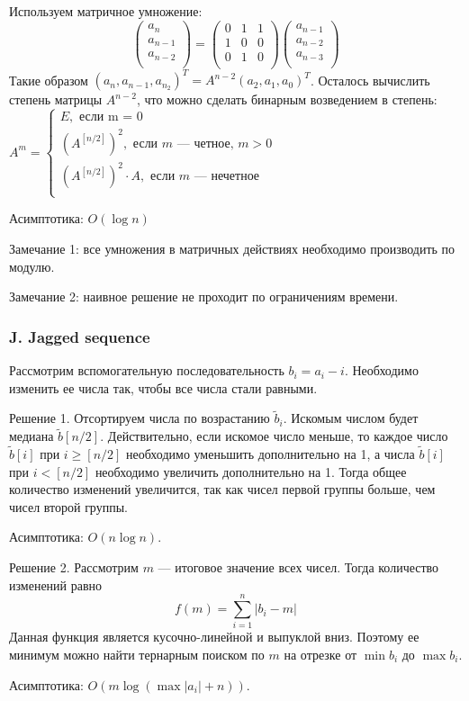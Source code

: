 Используем матричное умножение:
$$
\begin{pmatrix}
a_{n} \\
a_{n-1} \\
a_{n-2} \\
\end{pmatrix}
=
\begin{pmatrix}
0 & 1 & 1 \\
1 & 0 & 0 \\
0 & 1 & 0 \\
\end{pmatrix}
\begin{pmatrix}
a_{n-1} \\
a_{n-2} \\
a_{n-3} \\
\end{pmatrix}
$$
Такие образом $(a_n, a_{n-1}, a_{n_2})^{T} = A^{n-2} (a_2, a_1, a_0)^{T}$. Осталось вычислить степень матрицы $A^{n-2}$, что можно сделать бинарным возведением в степень:
$
A^m =
\begin{cases}
E, \text{ если m = 0}\\
\left(A^{[n/2]}\right) ^ 2, \text{ если } m \text{ --- четное, }m > 0\\
\left(A^{[n/2]}\right) ^ 2 \cdot A, \text{ если } m \text{ --- нечетное}\\
\end{cases}
$

Асимптотика: $O(\log n)$ 

Замечание 1: все умножения в матричных действиях необходимо производить по модулю.

Замечание 2: наивное решение не проходит по ограничениям времени.



\subsubsection*{J. Jagged sequence} 


Рассмотрим вспомогательную последовательность $b_i = a_i - i$. Необходимо изменить ее числа так, чтобы все числа стали равными.

Решение 1. Отсортируем числа по возрастанию $\tilde{b}_i$. Искомым числом будет медиана $\tilde{b}[n / 2]$. Действительно, если искомое число меньше, то каждое число $\tilde{b}[i]$ при $i \geqslant [n / 2]$ необходимо уменьшить дополнительно на 1, а числа $\tilde{b}[i]$ при $i < [n / 2]$ необходимо увеличить дополнительно на 1. Тогда общее количество изменений увеличится, так как чисел первой группы больше, чем чисел второй группы.

Асимптотика: $O(n \log{n})$.

Решение 2. Рассмотрим $m$ --- итоговое значение всех чисел. Тогда количество изменений равно
$$ f(m) = \sum_{i=1}^{n} |b_i - m|$$
Данная функция является кусочно-линейной и выпуклой вниз. Поэтому ее минимум можно найти тернарным поиском по $m$ на отрезке от $\min{b_i}$ до $\max{b_i}$.

Асимптотика: $O( m \log(\max|a_i|+n))$.